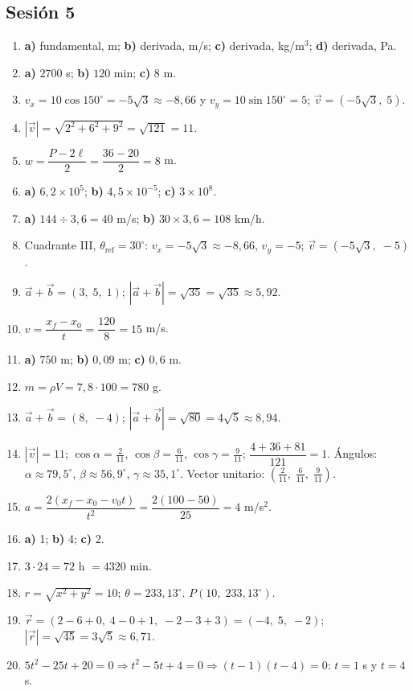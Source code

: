 \documentclass[12pt, letterpaper]{article}
\providecommand{\sen}{\sin}
\begin{document}
\subsection*{Sesión 5}
\begin{enumerate}[leftmargin=*, label=\textbf{\arabic*.}]
  \item \textbf{a)} fundamental, m; \textbf{b)} derivada, m/s; \textbf{c)} derivada, kg/m$^3$; \textbf{d)} derivada, Pa.
  \item \textbf{a)} $2700$ s; \textbf{b)} $120$ min; \textbf{c)} $8$ m.
  \item $v_x=10\cos 150^{\circ}=-5\sqrt{3}\approx -8{,}66$ y $v_y=10\sen 150^{\circ}=5$; $\vec v=(-5\sqrt{3},\; 5)$.
  \item $|\vec v|=\sqrt{2^2+6^2+9^2}=\sqrt{121}=11$.
  \item $w=\dfrac{P-2\ell}{2}=\dfrac{36-20}{2}=8$ m.
  \item \textbf{a)} $6{,}2 \times 10^{5}$; \textbf{b)} $4{,}5 \times 10^{-5}$; \textbf{c)} $3 \times 10^{8}$.
  \item \textbf{a)} $144 \div 3{,}6 = 40$ m/s; \quad \textbf{b)} $30 \times 3{,}6 = 108$ km/h.
  \item Cuadrante III, $\theta_{\text{ref}}=30^{\circ}$: $v_x=-5\sqrt{3}\approx -8{,}66$, $v_y=-5$; $\vec v=(-5\sqrt{3},\; -5)$.
  \item $\vec a+\vec b=(3,\; 5,\; 1)$; $|\vec a+\vec b|=\sqrt{35}=\sqrt{35}\approx 5{,}92$.
  \item $v=\dfrac{x_f-x_0}{t}=\dfrac{120}{8}=15$ m/s.
  \item \textbf{a)} $750$ m; \textbf{b)} $0{,}09$ m; \textbf{c)} $0{,}6$ m.
  \item $m=\rho V=7{,}8\cdot 100=780$ g.
  \item $\vec a+\vec b=(8,\; -4)$; $|\vec a+\vec b|=\sqrt{80}=4\sqrt{5}\approx 8{,}94$.
  \item $|\vec v|=11$; $\cos\alpha=\frac{2}{11}$, $\cos\beta=\frac{6}{11}$, $\cos\gamma=\frac{9}{11}$; $\dfrac{4+36+81}{121}=1$. \checkmark\quad Ángulos: $\alpha\approx 79{,}5^{\circ}$, $\beta\approx 56{,}9^{\circ}$, $\gamma\approx 35{,}1^{\circ}$. Vector unitario: $(\frac{2}{11},\; \frac{6}{11},\; \frac{9}{11})$.
  \item $a=\dfrac{2(x_f-x_0-v_0t)}{t^2}=\dfrac{2(100-50)}{25}=4$ m/s$^2$.
  \item \textbf{a)} 1; \quad \textbf{b)} 4; \quad \textbf{c)} 2.
  \item $3\cdot 24=72$ h $=4320$ min.
  \item $r=\sqrt{x^2+y^2}=10$; $\theta=233{,}13^{\circ}$. $P(10,\; 233{,}13^{\circ})$.
  \item $\vec r=(2-6+0,\; 4-0+1,\; -2-3+3)=(-4,\; 5,\; -2)$; $|\vec r|=\sqrt{45}=3\sqrt{5}\approx 6{,}71$.
  \item $5t^2-25t+20=0\Rightarrow t^2-5t+4=0\Rightarrow(t-1)(t-4)=0$: $t=1$ s y $t=4$ s.
\end{enumerate}
\end{document}
